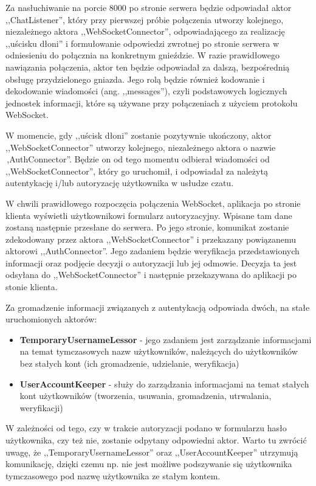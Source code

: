 Za nasłuchiwanie na porcie 8000 po stronie serwera będzie odpowiadał aktor ,,ChatListener'', który przy pierwszej próbie połączenia 
utworzy kolejnego, niezależnego aktora ,,WebSocketConnector'', odpowiadającego za realizację ,,uścisku dłoni'' i formułowanie odpowiedzi zwrotnej 
po stronie serwera w odniesieniu do połącznia na konkretnym gnieździe. W razie prawidłowego nawiązania połączenia, aktor ten będzie odpowiadał 
za dalszą, bezpośrednią obsługę przydzielonego gniazda. Jego rolą będzie również kodowanie i dekodowanie wiadomości (ang.
,,messages''), czyli podstawowych logicznych jednostek informacji, które są używane przy połączeniach z użyciem protokołu WebSocket.

W momencie, gdy ,,uścisk dłoni'' zostanie pozytywnie ukończony, aktor ,,WebSocketConnector'' utworzy kolejnego, niezależnego aktora o nazwie
\,,AuthConnector''. Będzie on od tego momentu odbierał wiadomości od ,,WebSocketConnector'', który go uruchomił, i odpowiadał za należytą
autentykację i/lub autoryzację użytkownika w usłudze czatu.

W chwili prawidłowego rozpoczęcia połączenia WebSocket, aplikacja po stronie klienta wyświetli użytkownikowi formularz autoryzacyjny. Wpisane
tam dane zostaną następnie przesłane do serwera. Po jego stronie, komunikat zostanie zdekodowany przez aktora ,,WebSocketConnector'' i
przekazany powiązanemu aktorowi ,,AuthConnector''. Jego zadaniem będzie weryfikacja przedstawionych informacji oraz podjęcie decyzji o autoryzacji
lub jej odmowie. Decyzja ta jest odsyłana do ,,WebSocketConnector'' i następnie przekazywana do aplikacji po stonie klienta.

Za gromadzenie informacji związanych z autentykacją odpowiada dwóch, na stałe uruchomionych aktorów:
\begin{itemize}
	\item \textbf{TemporaryUsernameLessor} - jego zadaniem jest zarządzanie informacjami na temat tymczasowych nazw użytkowników, należących do
	użytkowników bez stałych kont (ich gromadzenie, udzielanie, weryfikacja)
	\item \textbf{UserAccountKeeper} - służy do zarządzania informacjami na temat stałych kont użytkowników (tworzenia, usuwania, gromadzenia,
	utrwalania, weryfikacji)
\end{itemize}
W zależności od tego, czy w trakcie autoryzacji podano w formularzu hasło użytkownika, czy też nie, zostanie odpytany odpowiedni aktor. Warto tu
zwrócić uwagę, że ,,TemporaryUsernameLessor'' oraz ,,UserAccountKeeper'' utrzymują komunikację, dzięki czemu np. nie jest możliwe podszywanie się
użytkownika tymczasowego pod nazwę użytkownika ze stałym kontem.

